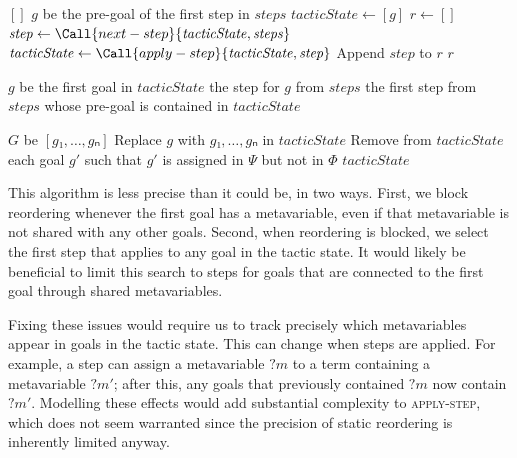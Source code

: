 \documentclass[sigplan,screen]{acmart}
\newcommand{\mvar}[1]{{?#1}}
\newlength{\cindentlen}
\newcommand{\cindent}{\hspace{\cindentlen}}
\begin{document}
\begin{algorithm}
  \begin{algorithmic}
        \State \Return $[]$
      \EndIf
      \State \Let $g$ be the pre-goal of the first step in $\mathit{steps}$
      \State $\mathit{tacticState} \gets [g]$
      \State $r \gets []$
        \State $\mathit{step} \gets \Call{next-step}{\mathit{tacticState}, \mathit{steps}}$
        \State $\mathit{tacticState} \gets \Call{apply-step}{\mathit{tacticState}, \mathit{step}}$
        \State Append $\mathit{step}$ to $r$
      \EndWhile
      \State \Return $r$
    \EndFunction

    \medskip

      \State \Let $g$ be the first goal in $\mathit{tacticState}$
        \State \Return the step for $g$ from $\mathit{steps}$
      \Else
        \State \Return the first step from $\mathit{steps}$ whose pre-goal is
        \State \hspace{\widthof{\Return}} \cindent contained in $\mathit{tacticState}$
      \EndIf
    \EndFunction

    \medskip

      \State \Let $G$ be $[g₁, \dots, gₙ]$
      \State Replace $g$ with $g₁, \dots, gₙ$ in $\mathit{tacticState}$
      \State Remove from $\mathit{tacticState}$ each goal $g'$ such that $g'$
      \State \cindent is assigned in $Ψ$ but not in $Φ$
      \State \Return $\mathit{tacticState}$
    \EndFunction
  \end{algorithmic}
  \caption{Static reordering}\label{alg:static-reordering}
\end{algorithm}

This algorithm is less precise than it could be, in two ways.
First, we block reordering whenever the first goal has a metavariable, even if that metavariable is not shared with any other goals.
Second, when reordering is blocked, we select the first step that applies to any goal in the tactic state.
It would likely be beneficial to limit this search to steps for goals that are connected to the first goal through shared metavariables.

Fixing these issues would require us to track precisely which metavariables appear in goals in the tactic state.
This can change when steps are applied.
For example, a step can assign a metavariable $\mvar{m}$ to a term containing a metavariable $\mvar{m'}$; after this, any goals that previously contained $\mvar{m}$ now contain $\mvar{m'}$.
Modelling these effects would add substantial complexity to \textsc{apply-step}, which does not seem warranted since the precision of static reordering is inherently limited anyway.
\end{document}
